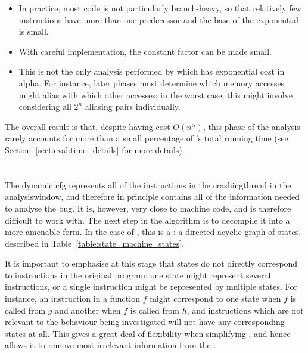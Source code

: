 \begin{itemize}
\item In practice, most code is not particularly branch-heavy, so that
  relatively few instructions have more than one predecessor and the
  base of the exponential is small.
\item With careful implementation, the constant factor can be made
  small.
\item This is not the only analysis performed by {\technique} which
  has exponential cost in \gls{alpha}.  For instance, later
  phases must determine which memory accesses might alias with which
  other accesses; in the worst case, this might involve considering
  all $2^n$ aliasing pairs individually.
\end{itemize}

The overall result is that, despite having cost $O(n^{\alpha})$, this
phase of the analysis rarely accounts for more than a small percentage
of {\implementation}'s total running time (see
Section~\ref{sect:eval:time_details} for more details).

\section{\STateMachines}
\label{sect:derive:state_machines}

The dynamic \gls{cfg} represents all of the instructions in the
\gls{crashingthread} in the \gls{analysiswindow}, and therefore in
principle contains all of the information needed to analyse the bug.
It is, however, very close to machine code, and is therefore difficult
to work with.  The next step in the algorithm is to decompile it into
a more amenable form.  In the case of {\technique}, this is a
{\StateMachine}: a directed acyclic graph of states, described in
Table~\ref{table:state_machine_states}.

It is important to emphasise at this stage that {\StateMachines}
states do not directly correspond to instructions in the original
program: one state might represent several instructions, or a single
instruction might be represented by multiple states.  For instance, an
instruction in a function $f$ might correspond to one state when $f$
is called from $g$ and another when $f$ is called from $h$, and
instructions which are not relevant to the behaviour being
investigated will not have any corresponding states at all.  This
gives {\technique} a great deal of flexibility when simplifying
{\StateMachines}, and hence allows it to remove most irrelevant
information from the {\StateMachine}.

